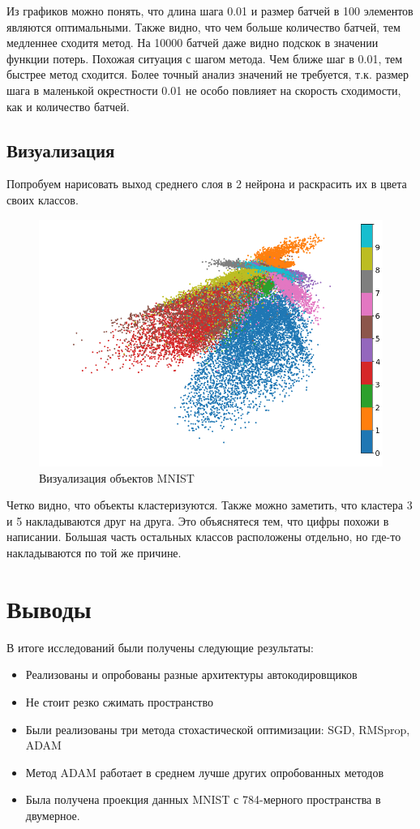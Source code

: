 \documentclass[12pt, a4paper]{article}
\begin{document}
        Из графиков можно понять, что длина шага 0.01 и размер батчей в 100 элементов являются оптимальными. Также видно, что чем больше количество батчей, тем медленнее сходитя метод. На 10000 батчей даже видно подскок в значении функции потерь. Похожая ситуация с шагом метода. Чем ближе шаг в 0.01, тем быстрее метод сходится. Более точный анализ значений не требуется, т.к. размер шага в маленькой окрестности 0.01 не особо повлияет на скорость сходимости, как и количество батчей.

        \subsection{Визуализация}
            Попробуем нарисовать выход среднего слоя в 2 нейрона и раскрасить их в цвета своих классов.
            \begin{figure}[h]
                \centering
                \includegraphics[width=\linewidth]{pics/2dim}
                \caption{Визуализация объектов MNIST}
                \label{fig:2dim}
            \end{figure}

            Четко видно, что объекты кластеризуются. Также можно заметить, что кластера 3 и 5 накладываются друг на друга. Это объяснятеся тем, что цифры похожи в написании. Большая часть остальных классов расположены отдельно, но где-то накладываются по той же причине.

    \section{Выводы}
        В итоге исследований были получены следующие результаты:
        \begin{itemize}
            \item Реализованы и опробованы разные архитектуры автокодировщиков
            \item Не стоит резко сжимать пространство
            \item Были реализованы три метода стохастической оптимизации: SGD, RMSprop, ADAM
            \item Метод ADAM работает в среднем лучше других опробованных методов
            \item Была получена проекция данных MNIST с 784-мерного пространства в двумерное.
        \end{itemize}
\end{document}
